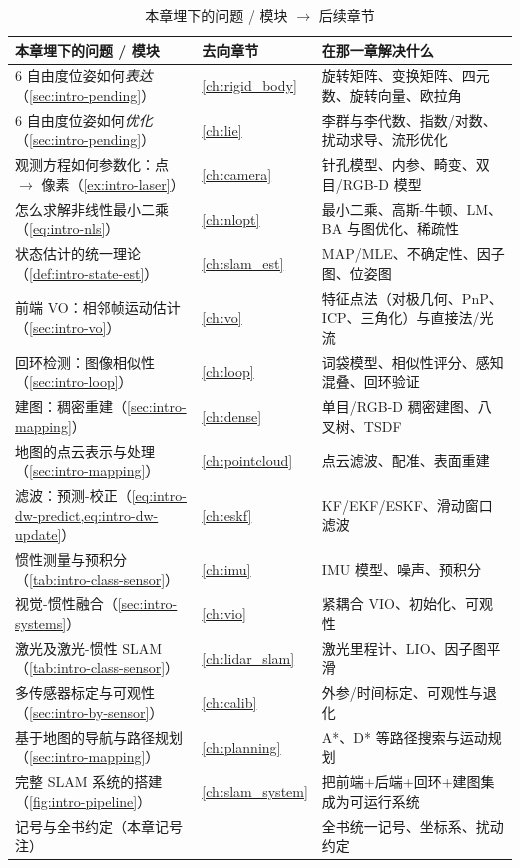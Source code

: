 \begin{table}[H]\centering\small
\caption{本章埋下的问题 / 模块 $\to$ 后续章节}
\label{tab:intro-roadmap}
\begin{tabular}{p{} p{} p{}}
\toprule
本章埋下的问题 / 模块 & 去向章节 & 在那一章解决什么 \\
\midrule
6 自由度位姿如何\emph{表达}（\cref{sec:intro-pending}） & \cref{ch:rigid_body} & 旋转矩阵、变换矩阵、四元数、旋转向量、欧拉角 \\
6 自由度位姿如何\emph{优化}（\cref{sec:intro-pending}） & \cref{ch:lie} & 李群与李代数、指数/对数、扰动求导、流形优化 \\
观测方程如何参数化：点 $\to$ 像素（\cref{ex:intro-laser}） & \cref{ch:camera} & 针孔模型、内参、畸变、双目/RGB-D 模型 \\
怎么求解非线性最小二乘（\cref{eq:intro-nls}） & \cref{ch:nlopt} & 最小二乘、高斯-牛顿、LM、BA 与图优化、稀疏性 \\
状态估计的统一理论（\cref{def:intro-state-est}） & \cref{ch:slam_est} & MAP/MLE、不确定性、因子图、位姿图 \\
前端 VO：相邻帧运动估计（\cref{sec:intro-vo}） & \cref{ch:vo} & 特征点法（对极几何、PnP、ICP、三角化）与直接法/光流 \\
回环检测：图像相似性（\cref{sec:intro-loop}） & \cref{ch:loop} & 词袋模型、相似性评分、感知混叠、回环验证 \\
建图：稠密重建（\cref{sec:intro-mapping}） & \cref{ch:dense} & 单目/RGB-D 稠密建图、八叉树、TSDF \\
地图的点云表示与处理（\cref{sec:intro-mapping}） & \cref{ch:pointcloud} & 点云滤波、配准、表面重建 \\
滤波：预测-校正（\cref{eq:intro-dw-predict,eq:intro-dw-update}） & \cref{ch:eskf} & KF/EKF/ESKF、滑动窗口滤波 \\
惯性测量与预积分（\cref{tab:intro-class-sensor}） & \cref{ch:imu} & IMU 模型、噪声、预积分 \\
视觉-惯性融合（\cref{sec:intro-systems}） & \cref{ch:vio} & 紧耦合 VIO、初始化、可观性 \\
激光及激光-惯性 SLAM（\cref{tab:intro-class-sensor}） & \cref{ch:lidar_slam} & 激光里程计、LIO、因子图平滑 \\
多传感器标定与可观性（\cref{sec:intro-by-sensor}） & \cref{ch:calib} & 外参/时间标定、可观性与退化 \\
基于地图的导航与路径规划（\cref{sec:intro-mapping}） & \cref{ch:planning} & A*、D* 等路径搜索与运动规划 \\
完整 SLAM 系统的搭建（\cref{fig:intro-pipeline}） & \cref{ch:slam_system} & 把前端+后端+回环+建图集成为可运行系统 \\
记号与全书约定（本章记号注） & \nameref{ch:notation} & 全书统一记号、坐标系、扰动约定 \\
\bottomrule
\end{tabular}
\end{table}

